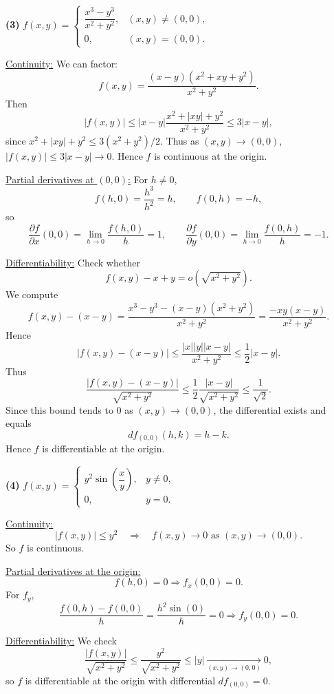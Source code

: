 \documentclass[12pt]{article}
\begin{document}
\begin{correctionbox}
\bigskip

\textbf{(3) } $\displaystyle f(x,y)=
\begin{cases}
\dfrac{x^3-y^3}{x^2+y^2}, & (x,y)\ne(0,0),\\[0.4em]
0, & (x,y)=(0,0).
\end{cases}$

\medskip
\underline{Continuity:}
We can factor:
\[
f(x,y)=\frac{(x-y)(x^2+xy+y^2)}{x^2+y^2}.
\]
Then
\[
|f(x,y)|\le |x-y|\frac{x^2+|xy|+y^2}{x^2+y^2}
\le 3|x-y|,
\]
since \(x^2+|xy|+y^2\le3(x^2+y^2)/2\). Thus as $(x,y)\to(0,0)$, $|f(x,y)|\le 3|x-y|\to0$.  
Hence \(f\) is continuous at the origin.

\medskip
\underline{Partial derivatives at $(0,0)$:}
For \(h\ne0\),
\[
f(h,0)=\frac{h^3}{h^2}=h,\qquad f(0,h)=-h,
\]
so
\[
\frac{\partial f}{\partial x}(0,0)=\lim_{h\to0}\frac{f(h,0)}{h}=1,\qquad
\frac{\partial f}{\partial y}(0,0)=\lim_{h\to0}\frac{f(0,h)}{h}=-1.
\]

\medskip
\underline{Differentiability:}
Check whether
\[
f(x,y)-x+y = o(\sqrt{x^2+y^2}).
\]
We compute
\[
f(x,y)-(x-y)=\frac{x^3-y^3-(x-y)(x^2+y^2)}{x^2+y^2}
=\frac{-xy(x-y)}{x^2+y^2}.
\]
Hence
\[
|f(x,y)-(x-y)|\le \frac{|x||y||x-y|}{x^2+y^2}
\le \frac{1}{2}|x-y|.
\]
Thus
\[
\frac{|f(x,y)-(x-y)|}{\sqrt{x^2+y^2}}\le\frac{1}{2}\frac{|x-y|}{\sqrt{x^2+y^2}}\le\frac{1}{\sqrt{2}}.
\]
Since this bound tends to \(0\) as $(x,y)\to(0,0)$, the differential exists and equals
\[
df_{(0,0)}(h,k)=h-k.
\]
Hence \(f\) is differentiable at the origin.

\bigskip

\textbf{(4) } $\displaystyle f(x,y)=
\begin{cases}
y^2\sin\!\left(\dfrac{x}{y}\right), & y\ne0,\\[0.4em]
0, & y=0.
\end{cases}$

\medskip
\underline{Continuity:}
\[
|f(x,y)|\le y^2\quad\Rightarrow\quad f(x,y)\to0\text{ as }(x,y)\to(0,0).
\]
So \(f\) is continuous.

\medskip
\underline{Partial derivatives at the origin:}
\[
f(h,0)=0\Rightarrow f_x(0,0)=0.
\]
For \(f_y\),
\[
\frac{f(0,h)-f(0,0)}{h}= \frac{h^2\sin(0)}{h}=0\Rightarrow f_y(0,0)=0.
\]

\medskip
\underline{Differentiability:}
We check
\[
\frac{|f(x,y)|}{\sqrt{x^2+y^2}}\le\frac{y^2}{\sqrt{x^2+y^2}}\le|y|\xrightarrow[(x,y)\to(0,0)]{}0,
\]
so \(f\) is differentiable at the origin with differential \(df_{(0,0)}=0\).
\end{correctionbox}
\end{document}
